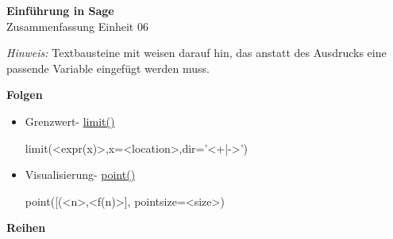 \documentclass[a4paper,9pt,DIV15,twocolumn]{scrartcl}
\begin{document}
\begin{center}
    \textbf{\LARGE Einführung in Sage}\\
    {\large Zusammenfassung Einheit 06}
\end{center}
\textsl{Hinweis:} Textbausteine mit  weisen darauf hin, das anstatt des Ausdrucks eine passende Variable eingefügt werden muss.

\medskip

\textbf{Folgen}

\begin{itemize}
 \item Grenzwert- \href{https://sage.math.uni-goettingen.de/doc/static/reference/sage/calculus/functional.html?highlight=function#sage.calculus.functional.limit}{limit()}
\begin{sagein}
limit(<expr(x)>,x=<location>,dir='<+|->')
\end{sagein}
\item Visualisierung- \href{https://sage.math.uni-goettingen.de/doc/static/reference/sage/plot/point.html?highlight=plot.point#points}{point()}
\begin{sagein}
point([(<n>,<f(n)>], pointsize=<size>)
\end{sagein}
\end{itemize}


\textbf{Reihen}
\end{document}
